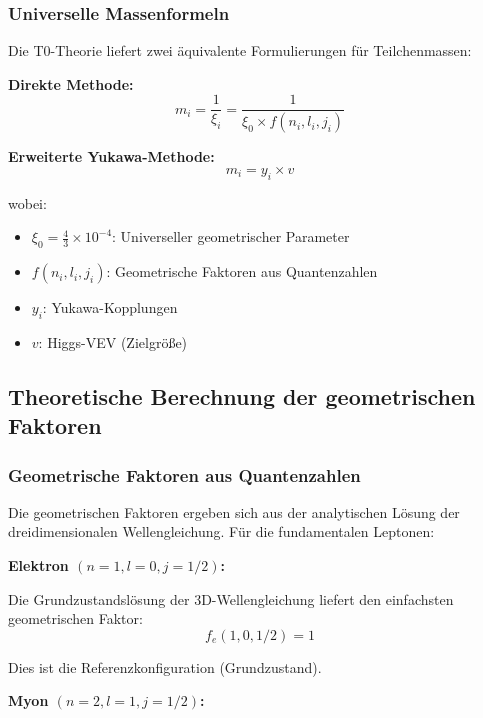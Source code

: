 \subsubsection{Universelle Massenformeln}

Die T0-Theorie liefert zwei äquivalente Formulierungen für Teilchenmassen:

\textbf{Direkte Methode:}
\begin{equation}
	m_i = \frac{1}{\xi_i} = \frac{1}{\xi_0 \times f(n_i, l_i, j_i)}
	\label{eq:direct_mass_formula}
\end{equation}

\textbf{Erweiterte Yukawa-Methode:}
\begin{equation}
	m_i = y_i \times v
	\label{eq:yukawa_mass_formula}
\end{equation}

wobei:
\begin{itemize}
	\item $\xi_0 = \frac{4}{3} \times 10^{-4}$: Universeller geometrischer Parameter
	\item $f(n_i, l_i, j_i)$: Geometrische Faktoren aus Quantenzahlen
	\item $y_i$: Yukawa-Kopplungen
	\item $v$: Higgs-VEV (Zielgröße)
\end{itemize}

\subsection{Theoretische Berechnung der geometrischen Faktoren}

\subsubsection{Geometrische Faktoren aus Quantenzahlen}

Die geometrischen Faktoren ergeben sich aus der analytischen Lösung der dreidimensionalen Wellengleichung. Für die fundamentalen Leptonen:

\textbf{Elektron $(n=1, l=0, j=1/2)$:}

Die Grundzustandslösung der 3D-Wellengleichung liefert den einfachsten geometrischen Faktor:
\begin{equation}
	f_e(1,0,1/2) = 1
\end{equation}

Dies ist die Referenzkonfiguration (Grundzustand).

\textbf{Myon $(n=2, l=1, j=1/2)$:}

